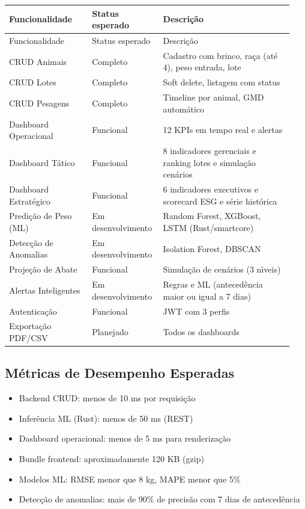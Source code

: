 \documentclass[12pt,a4paper]{article}
\begin{document}
\begin{longtable}{p{0.28\linewidth} p{0.22\linewidth} p{0.44\linewidth}}
\toprule
Funcionalidade & Status esperado & Descri\c c\~ao \\
\midrule
\endfirsthead
\toprule
Funcionalidade & Status esperado & Descri\c c\~ao \\
\midrule
\endhead
CRUD Animais & Completo & Cadastro com brinco, ra\c ca (at\'e 4), peso entrada, lote \\
CRUD Lotes & Completo & Soft delete, listagem com status \\
CRUD Pesagens & Completo & Timeline por animal, GMD autom\'atico \\
Dashboard Operacional & Funcional & 12 KPIs em tempo real e alertas \\
Dashboard T\'atico & Funcional & 8 indicadores gerenciais e ranking lotes e simula\c c\~ao cen\'arios \\
Dashboard Estrat\'egico & Funcional & 6 indicadores executivos e scorecard ESG e s\'erie hist\'orica \\
Predi\c c\~ao de Peso (ML) & Em desenvolvimento & Random Forest, XGBoost, LSTM (Rust/smartcore) \\
Detec\c c\~ao de Anomalias & Em desenvolvimento & Isolation Forest, DBSCAN \\
Proje\c c\~ao de Abate & Funcional & Simula\c c\~ao de cen\'arios (3 n\'{\i}veis) \\
Alertas Inteligentes & Em desenvolvimento & Regras e ML (anteced\^encia maior ou igual a 7 dias) \\
Autentica\c c\~ao & Funcional & JWT com 3 perfis \\
Exporta\c c\~ao PDF/CSV & Planejado & Todos os dashboards \\
\bottomrule
\end{longtable}

\subsection{M\'etricas de Desempenho Esperadas}

\begin{itemize}[leftmargin=*]
\item Backend CRUD: menos de 10 ms por requisi\c c\~ao
\item Infer\^encia ML (Rust): menos de 50 ms (REST)
\item Dashboard operacional: menos de 5 ms para renderiza\c c\~ao
\item Bundle frontend: aproximadamente 120 KB (gzip)
\item Modelos ML: RMSE menor que 8 kg, MAPE menor que 5\%
\item Detec\c c\~ao de anomalias: mais de 90\% de precis\~ao com 7 dias de anteced\^encia
\end{itemize}
\end{document}
